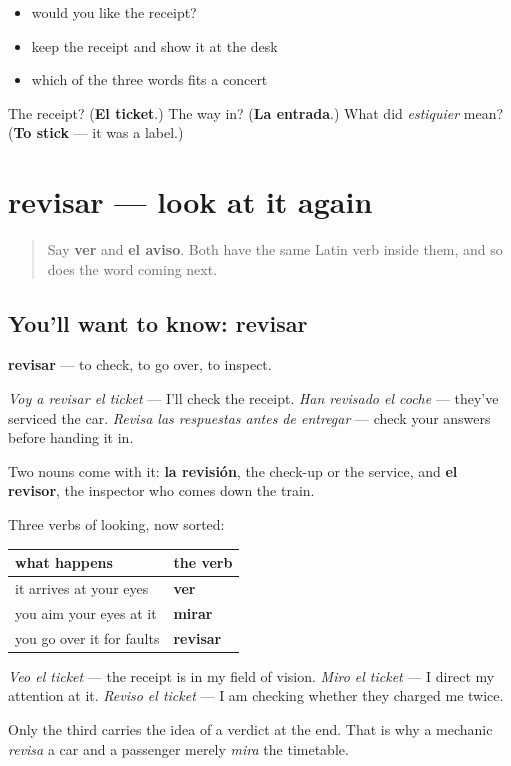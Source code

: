 \begin{itemize}
\raggedright
  \item would you like the receipt?
  \item keep the receipt and show it at the desk
  \item which of the three words fits a concert
\end{itemize}

\begin{tcolorbox}[breakable,colback=teal!4,colframe=teal!35!black,title={Before you move on}]
The receipt? (\textbf{El ticket}.) The way in? (\textbf{La entrada}.) What did \emph{estiquier} mean? (\textbf{To stick} — it was a label.)
\end{tcolorbox}
\section[revisar]{revisar — look at it again}

\label{lesson:ES-C451-revisar}



\begin{quote}
Say \textbf{ver} and \textbf{el aviso}. Both have the same Latin verb inside them, and so does the word coming next.
\end{quote}

\subsection*{You'll want to know: revisar}
\textbf{revisar} — to check, to go over, to inspect.

\emph{Voy a revisar el ticket} — I'll check the receipt. \emph{Han revisado el coche} — they've serviced the car. \emph{Revisa las respuestas antes de entregar} — check your answers before handing it in.

Two nouns come with it: \textbf{la revisión}, the check-up or the service, and \textbf{el revisor}, the inspector who comes down the train.

\begin{grammarlens}[title={Grammar Lens: revisar is not mirar}]
Three verbs of looking, now sorted:

\noindent
\begin{tabularx}{\linewidth}{@{}>{\raggedright\arraybackslash}X>{\raggedright\arraybackslash}X@{}}
\toprule
\textbf{what happens} & \textbf{the verb} \\
\midrule
it arrives at your eyes & \textbf{ver} \\
you aim your eyes at it & \textbf{mirar} \\
you go over it for faults & \textbf{revisar} \\
\bottomrule
\end{tabularx}

\emph{Veo el ticket} — the receipt is in my field of vision. \emph{Miro el ticket} — I direct my attention at it. \emph{Reviso el ticket} — I am checking whether they charged me twice.

Only the third carries the idea of a verdict at the end. That is why a mechanic \emph{revisa} a car and a passenger merely \emph{mira} the timetable.
\end{grammarlens}

